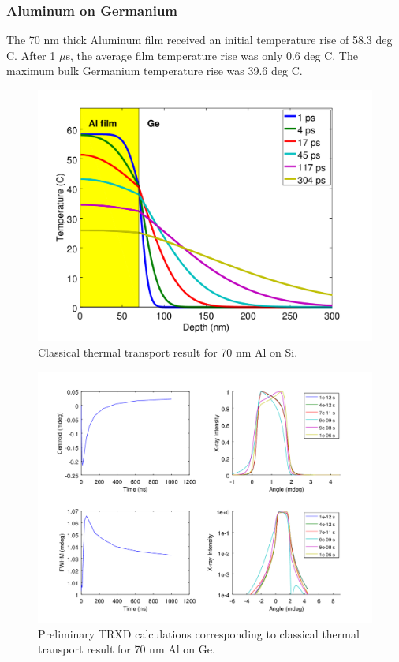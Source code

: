 \documentclass[letterpaper,11pt]{article}
\begin{document}
\subsubsection{Aluminum on Germanium}
The 70 nm thick Aluminum film received an initial temperature rise of 58.3 deg C. After 1 $\mu$s, the average film temperature rise was only 0.6 deg C.  The maximum bulk Germanium temperature rise was 39.6 deg C.
\begin{figure}
\includegraphics[scale = 0.65]{Ge_Temp.png}
\caption{Classical thermal transport result for 70 nm Al on Si.}
\end{figure}
\begin{figure}
\includegraphics[scale = 0.65]{Ge_TRXD.png}
\caption{Preliminary TRXD calculations corresponding to classical thermal transport result for 70 nm Al on Ge.}
\end{figure}
\newpage
\end{document}
